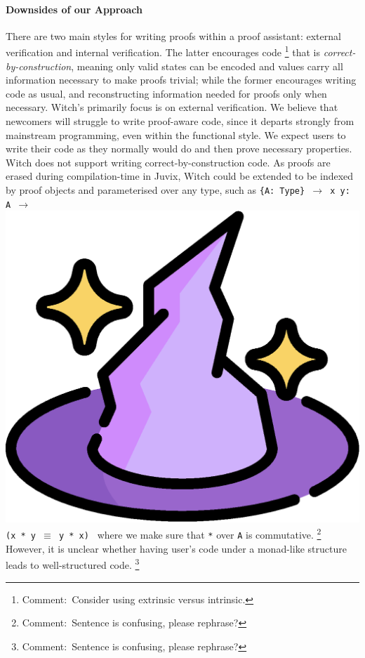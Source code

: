\documentclass[sigconfl]{acmart}
\newcommand{\comment}[1]{\footnote{Comment:~#1}}
\begin{document}
\paragraph{Downsides of our Approach}
There are two main styles for writing proofs within a proof assistant: external
verification and internal verification. The latter encourages code
\comment{Consider using extrinsic versus intrinsic.}
that is \textit{correct-by-construction}, meaning only valid states can be
encoded and values carry all information necessary to make proofs trivial; while
the former encourages writing code as usual, and reconstructing information
needed for proofs only when necessary.
Witch's primarily focus is on external verification. We believe that newcomers
will struggle to write proof-aware code, since it departs strongly from
mainstream programming, even within the functional style. We expect users to
write their code as they normally would do and then prove necessary properties.
Witch does not support writing correct-by-construction code. As proofs
are erased during compilation-time in Juvix, Witch could be extended
to be indexed by proof objects and parameterised over any type, such as
\texttt{\{A: Type\} $\rightarrow$ x y: A $\rightarrow$ }
\includegraphics[height=0.02\textheight]{image/hat.eps} \texttt{ (x * y $\equiv$
  y * x) } where we make sure that \texttt{*} over \texttt{A} is commutative.
\comment{Sentence is confusing, please rephrase?}
However, it is unclear whether having user's code under a monad-like structure leads
to well-structured code.
\comment{Sentence is confusing, please rephrase?}
\end{document}
